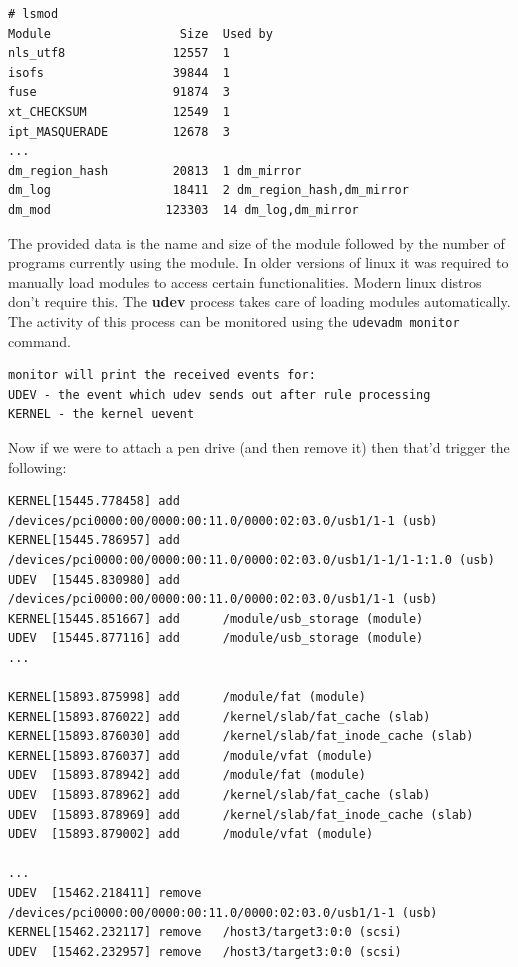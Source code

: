 \vspace{-15pt}
\begin{verbatim}
# lsmod
Module                  Size  Used by
nls_utf8               12557  1 
isofs                  39844  1 
fuse                   91874  3 
xt_CHECKSUM            12549  1 
ipt_MASQUERADE         12678  3 
...
dm_region_hash         20813  1 dm_mirror
dm_log                 18411  2 dm_region_hash,dm_mirror
dm_mod                123303  14 dm_log,dm_mirror
\end{verbatim}
\vspace{-10pt}

\noindent
The provided data is the name and size of the module followed by the number of programs currently using the module. In older versions of linux it was required to manually load modules to access certain functionalities. Modern linux distros don't require this. The \textbf{udev} process takes care of loading modules automatically. The activity of this process can be monitored using the \verb|udevadm monitor| command.

\vspace{-15pt}
\begin{verbatim}
monitor will print the received events for:
UDEV - the event which udev sends out after rule processing
KERNEL - the kernel uevent
\end{verbatim}
\vspace{-10pt}

\noindent
Now if we were to attach a pen drive (and then remove it) then that'd trigger the following:

\vspace{-15pt}
\begin{verbatim}
KERNEL[15445.778458] add      /devices/pci0000:00/0000:00:11.0/0000:02:03.0/usb1/1-1 (usb)
KERNEL[15445.786957] add      /devices/pci0000:00/0000:00:11.0/0000:02:03.0/usb1/1-1/1-1:1.0 (usb)
UDEV  [15445.830980] add      /devices/pci0000:00/0000:00:11.0/0000:02:03.0/usb1/1-1 (usb)
KERNEL[15445.851667] add      /module/usb_storage (module)
UDEV  [15445.877116] add      /module/usb_storage (module)
...

KERNEL[15893.875998] add      /module/fat (module)
KERNEL[15893.876022] add      /kernel/slab/fat_cache (slab)
KERNEL[15893.876030] add      /kernel/slab/fat_inode_cache (slab)
KERNEL[15893.876037] add      /module/vfat (module)
UDEV  [15893.878942] add      /module/fat (module)
UDEV  [15893.878962] add      /kernel/slab/fat_cache (slab)
UDEV  [15893.878969] add      /kernel/slab/fat_inode_cache (slab)
UDEV  [15893.879002] add      /module/vfat (module)

...
UDEV  [15462.218411] remove   /devices/pci0000:00/0000:00:11.0/0000:02:03.0/usb1/1-1 (usb)
KERNEL[15462.232117] remove   /host3/target3:0:0 (scsi)
UDEV  [15462.232957] remove   /host3/target3:0:0 (scsi)
\end{verbatim}
\vspace{-10pt}

